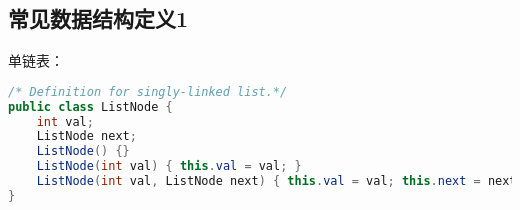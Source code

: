\documentclass[../../../interview-questions.tex]{subfiles}
\begin{document}
\subsection{常见数据结构定义1}

单链表：

\begin{lstlisting}[language=Java]
/* Definition for singly-linked list.*/
public class ListNode {
    int val;
    ListNode next;
    ListNode() {}
    ListNode(int val) { this.val = val; }
    ListNode(int val, ListNode next) { this.val = val; this.next = next; }
}
\end{lstlisting}
\end{document}
